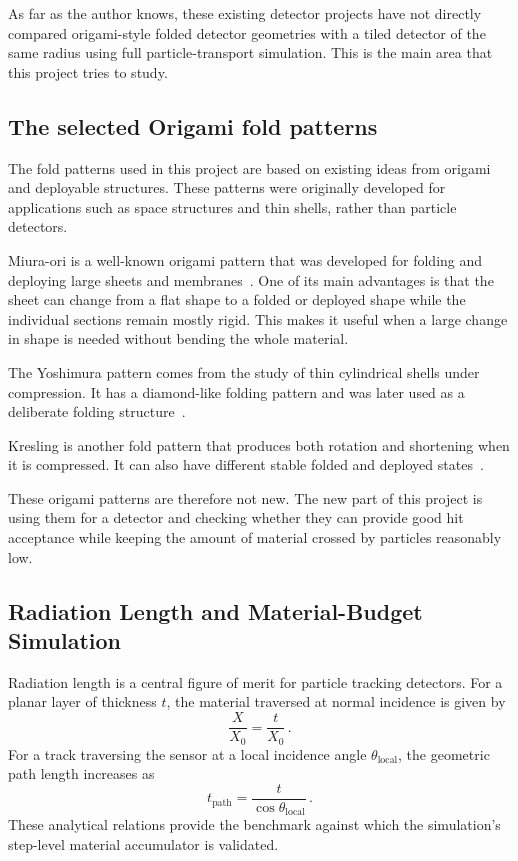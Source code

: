 \documentclass[a4paper,11pt]{article}
\begin{document}
As far as the author knows, these existing detector projects have not directly compared origami-style folded detector geometries with a tiled detector of the same radius using full particle-transport simulation. This is the main area that this project tries to study.

\subsection{The selected Origami fold patterns}

The fold patterns used in this project are based on existing ideas from origami and deployable structures. These patterns were originally developed for applications such as space structures and thin shells, rather than particle detectors.

Miura-ori is a well-known origami pattern that was developed for folding and deploying large sheets and membranes~\cite{Miura1985}. One of its main advantages is that the sheet can change from a flat shape to a folded or deployed shape while the individual sections remain mostly rigid. This makes it useful when a large change in shape is needed without bending the whole material.

The Yoshimura pattern comes from the study of thin cylindrical shells under compression. It has a diamond-like folding pattern and was later used as a deliberate folding structure~\cite{Yoshimura1955}. 

Kresling is another fold pattern that produces both rotation and shortening when it is compressed. It can also have different stable folded and deployed states~\cite{Kresling2008}.

These origami patterns are therefore not new. The new part of this project is using them for a detector and checking whether they can provide good hit acceptance while keeping the amount of material crossed by particles reasonably low.

\subsection{Radiation Length and Material-Budget Simulation}

Radiation length is a central figure of merit for particle tracking detectors. For a planar layer of thickness $t$, the material traversed at normal incidence is given by
\begin{equation}
\frac{X}{X_0} = \frac{t}{X_0}\,.
\end{equation}
For a track traversing the sensor at a local incidence angle $\theta_{\mathrm{local}}$, the geometric path length increases as
\begin{equation}
t_{\mathrm{path}} = \frac{t}{\cos\theta_{\mathrm{local}}}\,.
\end{equation}
These analytical relations provide the benchmark against which the simulation's step-level material accumulator is validated.
\end{document}
